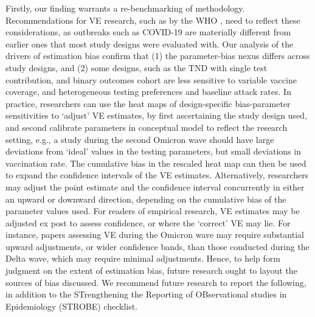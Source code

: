 \documentclass[12pt]{article}
\begin{document}
Firstly, our finding warrants a re-benchmarking of methodology. Recommendations for VE research, such as by the WHO \citep{world2021evaluation}, need to reflect these considerations, as outbreaks such as COVID-19 are materially different from earlier ones that most study designs were evaluated with. Our analysis of the drivers of estimation bias confirm that (1) the parameter-bias nexus differs across study designs, and (2) some designs, such as the TND with single test contribution, and binary outcomes cohort are less sensitive to variable vaccine coverage, and heterogeneous testing preferences and baseline attack rates. In practice, researchers can use the heat maps of design-specific bias-parameter sensitivities to `adjust' VE estimates, by first ascertaining the study design used, and second calibrate parameters in conceptual model to reflect the research setting, e.g., a study during the second Omicron wave should have large deviations from `ideal' values in the testing parameters, but small deviations in vaccination rate. The cumulative bias in the rescaled heat map can then be used to expand the confidence intervals of the VE estimates. Alternatively, researchers may adjust the point estimate and the confidence interval concurrently in either an upward or downward direction, depending on the cumulative bias of the parameter values used. For readers of empirical research, VE estimates may be adjusted ex post to assess confidence, or where the `correct' VE may lie. For instance, papers assessing VE during the Omicron wave may require substantial upward adjustments, or wider confidence bands, than those conducted during the Delta wave, which may require minimal adjustments. Hence, to help form judgment on the extent of estimation bias, future research ought to layout the sources of bias discussed. We recommend future research to report the following, in addition to the STrengthening the Reporting of OBservational studies in Epidemiology (STROBE) checklist.
\end{document}
